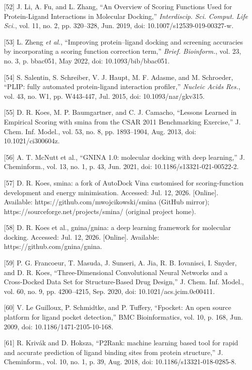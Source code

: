 {[}52{]} J. Li, A. Fu, and L. Zhang, ``An Overview of Scoring Functions Used for Protein-Ligand Interactions in Molecular Docking,'' \emph{Interdiscip. Sci. Comput. Life Sci.}, vol. 11, no. 2, pp. 320--328, Jun. 2019, doi: 10.1007/s12539-019-00327-w.

{[}53{]} L. Zheng \emph{et al.}, ``Improving protein--ligand docking and screening accuracies by incorporating a scoring function correction term,'' \emph{Brief. Bioinform.}, vol. 23, no. 3, p. bbac051, May 2022, doi: 10.1093/bib/bbac051.

{[}54{]} S. Salentin, S. Schreiber, V. J. Haupt, M. F. Adasme, and M. Schroeder, ``PLIP: fully automated protein-ligand interaction profiler,'' \emph{Nucleic Acids Res.}, vol. 43, no. W1, pp. W443-447, Jul. 2015, doi: 10.1093/nar/gkv315.

{[}55{]} D. R. Koes, M. P. Baumgartner, and C. J. Camacho, ``Lessons Learned in Empirical Scoring with smina from the CSAR 2011 Benchmarking Exercise,'' J. Chem. Inf. Model., vol. 53, no. 8, pp. 1893--1904, Aug. 2013, doi: 10.1021/ci300604z.

{[}56{]} A. T. McNutt et al., ``GNINA 1.0: molecular docking with deep learning,'' J. Cheminform., vol. 13, no. 1, p. 43, Jun. 2021, doi: 10.1186/s13321-021-00522-2.

{[}57{]} D. R. Koes, smina: a fork of AutoDock Vina customised for scoring-function development and energy minimisation. Accessed: Jul. 12, 2026. {[}Online{]}. Available: https://github.com/mwojcikowski/smina (GitHub mirror); https://sourceforge.net/projects/smina/ (original project home).

{[}58{]} D. R. Koes et al., gnina/gnina: a deep learning framework for molecular docking. Accessed: Jul. 12, 2026. {[}Online{]}. Available: https://github.com/gnina/gnina.

{[}59{]} P. G. Francoeur, T. Masuda, J. Sunseri, A. Jia, R. B. Iovanisci, I. Snyder, and D. R. Koes, ``Three-Dimensional Convolutional Neural Networks and a Cross-Docked Data Set for Structure-Based Drug Design,'' J. Chem. Inf. Model., vol. 60, no. 9, pp. 4200--4215, Sep. 2020, doi: 10.1021/acs.jcim.0c00411.

{[}60{]} V. Le Guilloux, P. Schmidtke, and P. Tuffery, ``Fpocket: An open source platform for ligand pocket detection,'' BMC Bioinformatics, vol. 10, p. 168, Jun. 2009, doi: 10.1186/1471-2105-10-168.

{[}61{]} R. Krivák and D. Hoksza, ``P2Rank: machine learning based tool for rapid and accurate prediction of ligand binding sites from protein structure,'' J. Cheminform., vol. 10, no. 1, p. 39, Aug. 2018, doi: 10.1186/s13321-018-0285-8.

